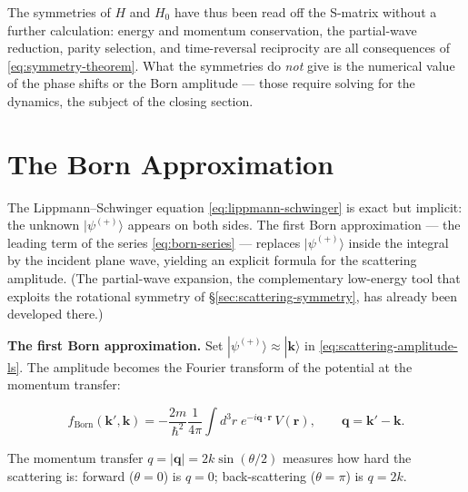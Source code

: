 The symmetries of $H$ and $H_{0}$ have thus been read off the S-matrix without a further calculation: energy and momentum conservation, the partial-wave reduction, parity selection, and time-reversal reciprocity are all consequences of \eqref{eq:symmetry-theorem}. What the symmetries do \emph{not} give is the numerical value of the phase shifts or the Born amplitude --- those require solving for the dynamics, the subject of the closing section.

\section{The Born Approximation}
\label{sec:born-partial-waves}

The Lippmann--Schwinger equation \eqref{eq:lippmann-schwinger} is exact but implicit: the unknown $|\psi^{(+)}\rangle$ appears on both sides. The first Born approximation --- the leading term of the series \eqref{eq:born-series} --- replaces $|\psi^{(+)}\rangle$ inside the integral by the incident plane wave, yielding an explicit formula for the scattering amplitude. (The partial-wave expansion, the complementary low-energy tool that exploits the rotational symmetry of \S\ref{sec:scattering-symmetry}, has already been developed there.)

\medskip\noindent\textbf{The first Born approximation.}
Set $|\psi^{(+)}\rangle\approx|\bm k\rangle$ in \eqref{eq:scattering-amplitude-ls}. The amplitude becomes the Fourier transform of the potential at the momentum transfer:
\begin{linenomath}
\begin{equation}
f_{\text{Born}}(\bm k',\bm k)=-\frac{2m}{\hbar^{2}}\frac{1}{4\pi}\int d^{3}r\;e^{-i\bm q\cdot\bm r}\,V(\bm r),\qquad \bm q=\bm k'-\bm k.
\label{eq:born-amplitude}
\end{equation}
\end{linenomath}
The momentum transfer $q=|\bm q|=2k\sin(\theta/2)$ measures how hard the scattering is: forward ($\theta=0$) is $q=0$; back-scattering ($\theta=\pi$) is $q=2k$.

